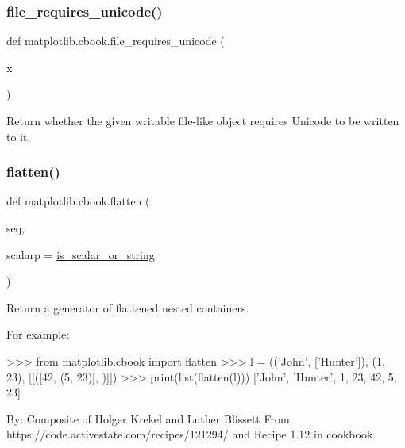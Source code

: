 \subsubsection{\texorpdfstring{file\+\_\+requires\+\_\+unicode()}{file\_requires\_unicode()}}
{\footnotesize\ttfamily def matplotlib.\+cbook.\+file\+\_\+requires\+\_\+unicode (\begin{DoxyParamCaption}\item[{}]{x }\end{DoxyParamCaption})}

\begin{DoxyVerb}Return whether the given writable file-like object requires Unicode to be
written to it.
\end{DoxyVerb}
 \mbox{\label{namespacematplotlib_1_1cbook_a30259be2209ddb2e1657d99d4bb80096}} 
\subsubsection{\texorpdfstring{flatten()}{flatten()}}
{\footnotesize\ttfamily def matplotlib.\+cbook.\+flatten (\begin{DoxyParamCaption}\item[{}]{seq,  }\item[{}]{scalarp = {\ttfamily \hyperlink{namespacematplotlib_1_1cbook_aa8e64eb7c542afa5d04be09e16c73607}{is\+\_\+scalar\+\_\+or\+\_\+string}} }\end{DoxyParamCaption})}

\begin{DoxyVerb}Return a generator of flattened nested containers.

For example:

    >>> from matplotlib.cbook import flatten
    >>> l = (('John', ['Hunter']), (1, 23), [[([42, (5, 23)], )]])
    >>> print(list(flatten(l)))
    ['John', 'Hunter', 1, 23, 42, 5, 23]

By: Composite of Holger Krekel and Luther Blissett
From: https://code.activestate.com/recipes/121294/
and Recipe 1.12 in cookbook
\end{DoxyVerb}
 \mbox{\label{namespacematplotlib_1_1cbook_ad9abd637312c02b7c26d7d5037fddc5d}} 
